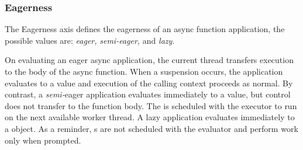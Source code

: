 \subsubsection{Eagerness}\label{ssec:designdims:eagerness} The Eagerness axis defines the eagerness of an async function application, the possible values are: \textit{eager,} \textit{semi-eager,} and \textit{lazy.}


On evaluating an eager async application, the current thread transfers execution to the body of the async function. When a suspension occurs, the application evaluates to a \Task{} value and execution of the calling context proceeds as normal. By contrast, a \textit{semi-}eager application evaluates immediately to a \Task{} value, but control does not transfer to the function body. The \Task{} is scheduled with the executor to run on the next available worker thread. A lazy application evaluates immediately to a \Coro{} object. As a reminder, \Coro{}s are not scheduled with the evaluator and perform work only when prompted.

